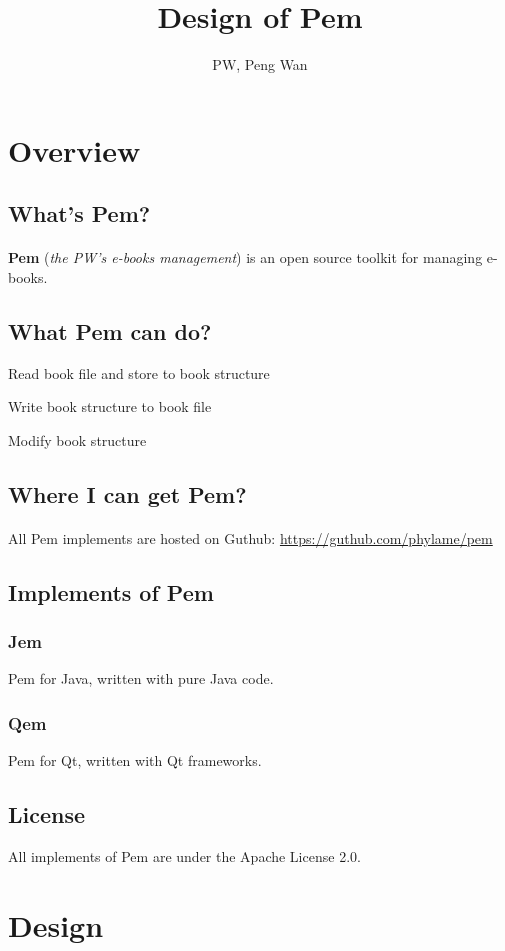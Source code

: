 \documentclass[10pt]{article}
\title{Design of Pem}
\author{PW, Peng Wan}
\begin{document}
	\maketitle
	\tableofcontents
	\section{Overview}
		\subsection{What's Pem?}
			\paragraph{} \textbf{Pem} (\textit{the PW's e-books management}) is an open source toolkit for managing e-books.
		\subsection{What Pem can do?}
			\begin{list}{}{}
				\item Read book file and store to book structure
				\item Write book structure to book file
				\item Modify book structure
			\end{list}
		\subsection{Where I can get Pem?}
			\paragraph{} All Pem implements are hosted on Guthub: \url{https://guthub.com/phylame/pem}
		\subsection{Implements of Pem}
			\subsubsection{Jem} Pem for Java, written with pure Java code.
			\subsubsection{Qem} Pem for Qt, written with Qt frameworks.
		\subsection{License}
			All implements of Pem are under the Apache License 2.0.
	\pagebreak 
	\section{Design}
\end{document}
